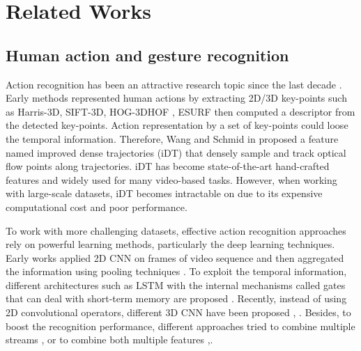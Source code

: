 
\section{Related Works} \label{sec:related_works}

    \subsection{Human action and gesture recognition}
        Action recognition has been an attractive research topic since the last decade \cite{zhang2019comprehensive}.
        Early methods represented human actions by extracting 2D/3D key-points such as Harris-3D, SIFT-3D, HOG-3DHOF \cite{laptev2008learning}, ESURF \cite{willems2008efficient} then computed a descriptor from the detected key-points.
        Action representation  by a set of key-points could loose the temporal information. Therefore, Wang and Schmid in \cite{wang2013action} proposed a feature named improved dense trajectories (iDT) that densely sample and track optical flow points along trajectories.
        iDT has become state-of-the-art hand-crafted features and widely used for many video-based tasks.
        However, when working with large-scale datasets, iDT becomes intractable on due to its expensive computational cost and poor performance. 

        To work with more challenging datasets, effective action recognition approaches rely on powerful learning methods, particularly the deep learning techniques.
        Early works applied 2D CNN on frames of video sequence and then aggregated the information using pooling techniques \cite{karpathy2014large}.
        To exploit the temporal information, different architectures such as LSTM with the internal mechanisms called gates that can deal with short-term memory are proposed \cite{sun2017lattice}.
        Recently, instead of using 2D convolutional operators, different 3D CNN have been proposed \cite{ji20123d, tran2015learning}, \cite{varol2017long}.
        Besides, to boost the recognition performance, different approaches tried to combine multiple streams \cite{wang2015towards, feichtenhofer2016convolutional}, \cite{khong2018improving} or to combine both multiple features \cite{wang2015action},\cite{christoph2016spatiotemporal}. %

